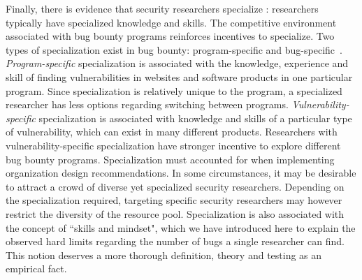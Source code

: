 Finally, there is evidence that security researchers specialize : researchers typically have specialized knowledge and skills. The competitive environment associated with bug bounty programs reinforces incentives to specialize. Two types of specialization exist in bug bounty: program-specific and bug-specific~\cite{zhao2014exploratory,zhao2015empirical}. \textit{Program-specific} specialization is associated with the knowledge, experience and skill of finding vulnerabilities in websites and software products in one particular program. Since specialization is relatively unique to the program, a specialized researcher has less options regarding switching between programs. \textit{Vulnerability-specific} specialization is associated with knowledge and skills of a particular type of vulnerability, which can exist in many different products. Researchers with vulnerability-specific specialization have stronger incentive to explore different bug bounty programs. Specialization must accounted for when implementing organization design recommendations. In some circumstances, it may be desirable to attract a crowd of diverse yet specialized security researchers. Depending on the specialization required, targeting specific security researchers may however restrict the diversity of the resource pool. Specialization is also associated with the concept of ``skills and mindset", which we have introduced here to explain the observed hard limits regarding the number of bugs a single researcher can find. This notion deserves a more thorough definition, theory and testing as an empirical fact. \\





